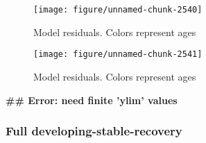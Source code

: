 \documentclass[a4paper]{article}\usepackage{graphicx, color}
\makeatletter
\def\maxwidth{ %
  \ifdim\Gin@nat@width>\linewidth
    \linewidth
  \else
    \Gin@nat@width
  \fi
}
\newenvironment{kframe}{%
 \def\at@end@of@kframe{}%
 \ifinner\ifhmode%
  \def\at@end@of@kframe{\end{minipage}}%
  \begin{minipage}{\columnwidth}%
 \fi\fi%
 \def\FrameCommand##1{\hskip\@totalleftmargin \hskip-\fboxsep
 \colorbox{shadecolor}{##1}\hskip-\fboxsep
     \hskip-\linewidth \hskip-\@totalleftmargin \hskip\columnwidth}%
 \MakeFramed {\advance\hsize-\width
   \@totalleftmargin\z@ \linewidth\hsize
   \@setminipage}}%
 {\par\unskip\endMakeFramed%
 \at@end@of@kframe}
\newenvironment{knitrout}{}{} %
\makeatother
\begin{document}
\begin{knitrout}
\begin{figure}[H]
{\centering \texttt{[image: figure/unnamed-chunk-2540]} 

}

\caption[Model residuals]{Model residuals. Colors represent ages\label{fig:unnamed-chunk-2540}}
\end{figure}
\begin{figure}[H]


{\centering \texttt{[image: figure/unnamed-chunk-2541]} 

}

\caption[Model residuals]{Model residuals. Colors represent ages\label{fig:unnamed-chunk-2541}}
\end{figure}
\begin{kframe}

{\ttfamily\noindent\bfseries\textcolor{errorcolor}{\#\# Error: need finite 'ylim' values}}\end{kframe}
\end{knitrout}


\subsubsection*{Full developing-stable-recovery}
\end{document}
